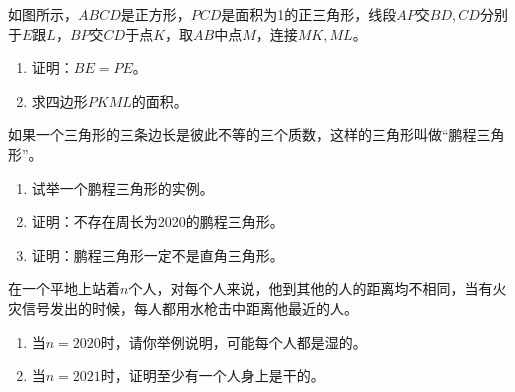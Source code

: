\begin{question}
  如图所示，$ABCD$是正方形，$PCD$是面积为1的正三角形，线段$AP$交$BD, CD$分别于$E$跟$L$，$BP$交$CD$于点$K$，取$AB$中点$M$，连接$MK,ML$。
  \begin{enumerate}
  \item 证明：$BE=PE$。
  \item 求四边形$PKML$的面积。
  \end{enumerate}

  \begin{center}
  \end{center}
\end{question}


\begin{question}
  如果一个三角形的三条边长是彼此不等的三个质数，这样的三角形叫做“鹏程三角形”。
  \begin{enumerate}
  \item 试举一个鹏程三角形的实例。
  \item 证明：不存在周长为2020的鹏程三角形。
  \item 证明：鹏程三角形一定不是直角三角形。
  \end{enumerate}
\end{question}


\begin{question}
  在一个平地上站着$n$个人，对每个人来说，他到其他的人的距离均不相同，当有火灾信号发出的时候，每人都用水枪击中距离他最近的人。
  \begin{enumerate}
  \item 当$n=2020$时，请你举例说明，可能每个人都是湿的。
  \item 当$n=2021$时，证明至少有一个人身上是干的。
  \end{enumerate}
\end{question}



